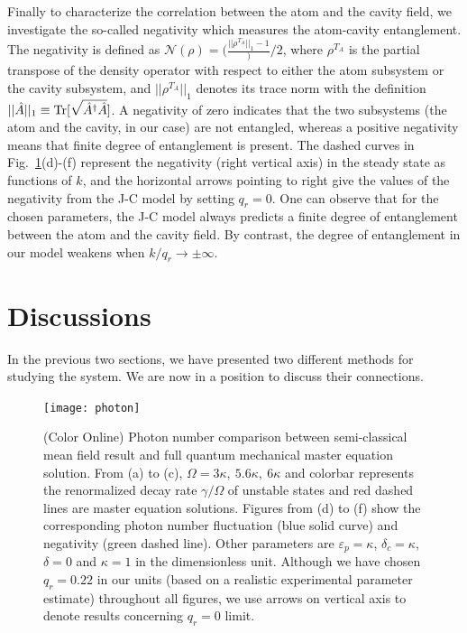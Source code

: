 \documentclass[atoms,article,submit,moreauthors,pdftex,12pt,a4paper]{mdpi}
\begin{document}
Finally to characterize the correlation between the atom and the cavity field, we investigate the so-called negativity \cite{negativity} which measures the atom-cavity entanglement.
The negativity is defined as $\mathcal{N}(\rho)=(\frac{||\rho^{T_A}||_1-1})/{2}$, where $\rho^{T_A}$ is the partial transpose of the density operator with respect to either the atom subsystem or the cavity subsystem, and $||\rho^{T_A}||_1$ denotes its trace norm with the definition $||\hat{A}||_1 \equiv {\rm Tr}[\sqrt{\hat{A}^\dag \hat{A}} ]$. A negativity of zero indicates that the two subsystems (the atom and the cavity, in our case) are not entangled, whereas a positive negativity means that finite degree of entanglement is present. The dashed curves in Fig.~\ref{photon}(d)-(f) represent the negativity (right vertical axis) in the steady state as functions of $k$, and the horizontal arrows pointing to right give the values of the negativity from the J-C model by setting $q_r=0$. One can observe that for the chosen parameters, the J-C model always predicts a finite degree of entanglement between the atom and the cavity field. By contrast, the degree of entanglement in our model weakens when $k/q_r \longrightarrow \pm \infty$.

\section{Discussions} \label{relation}

In the previous two sections, we have presented two different methods for studying the system. We are now in a position to discuss their connections. 

\begin{figure}[htp]
\texttt{[image: photon]}
\caption{ (Color Online) Photon number comparison between semi-classical mean field result and full quantum mechanical master equation solution. From (a) to (c), $\Omega = 3\kappa,\ 5.6\kappa,\ 6\kappa$ and colorbar represents the renormalized decay rate $\gamma/\Omega$ of unstable states and red dashed lines are master equation solutions. Figures from (d) to (f) show the corresponding photon number fluctuation (blue solid curve) and negativity (green dashed line). Other parameters are $\varepsilon_p=\kappa$, $\delta_c=\kappa$, $\delta=0$ and $\kappa=1$ in the dimensionless unit. Although we have chosen $q_r=0.22$ in our units (based on a realistic experimental parameter estimate) throughout all figures, we use arrows on vertical axis to denote results concerning $q_r=0$ limit. 
}
\label{photon}
\end{figure}
\end{document}
